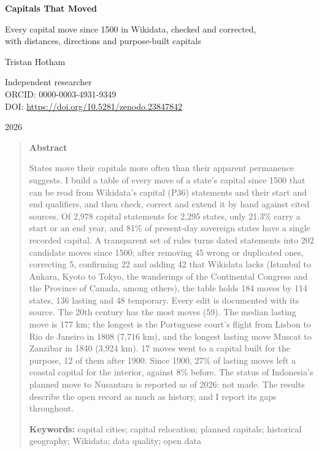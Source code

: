 \documentclass[11pt,a4paper]{article}
\begin{document}
\begin{center}
{\Large\bfseries Capitals That Moved\par}
\vspace{0.4em}
{\large Every capital move since 1500 in Wikidata, checked and corrected,\\with distances, directions and purpose-built capitals\par}
\vspace{1.2em}
{\large Tristan Hotham\par}
\vspace{0.3em}
{\small Independent researcher\\
ORCID: 0000-0003-4931-9349\\
DOI: \href{https://doi.org/10.5281/zenodo.23847842}{https://doi.org/10.5281/zenodo.23847842}\par}
\vspace{0.8em}
2026
\end{center}

\begin{quote}
\small
\begin{center}\textbf{Abstract}\end{center}
States move their capitals more often than their apparent permanence suggests. I build a table of every move of a state's capital since 1500 that can be read from Wikidata's capital (P36) statements and their start and end qualifiers, and then check, correct and extend it by hand against cited sources. Of 2,978 capital statements for 2,295 states, only 21.3\% carry a start or an end year, and 81\% of present-day sovereign states have a single recorded capital. A transparent set of rules turns dated statements into 202 candidate moves since 1500; after removing 45 wrong or duplicated ones, correcting 5, confirming 22 and adding 42 that Wikidata lacks (Istanbul to Ankara, Kyoto to Tokyo, the wanderings of the Continental Congress and the Province of Canada, among others), the table holds 184 moves by 114 states, 136 lasting and 48 temporary. Every edit is documented with its source. The 20th century has the most moves (59). The median lasting move is 177 km; the longest is the Portuguese court's flight from Lisbon to Rio de Janeiro in 1808 (7,716 km), and the longest lasting move Muscat to Zanzibar in 1840 (3,924 km). 17 moves went to a capital built for the purpose, 12 of them after 1900. Since 1900, 27\% of lasting moves left a coastal capital for the interior, against 8\% before. The status of Indonesia's planned move to Nusantara is reported as of 2026: not made. The results describe the open record as much as history, and I report its gaps throughout.

\textbf{Keywords:} capital cities; capital relocation; planned capitals; historical geography; Wikidata; data quality; open data
\end{quote}
\end{document}
